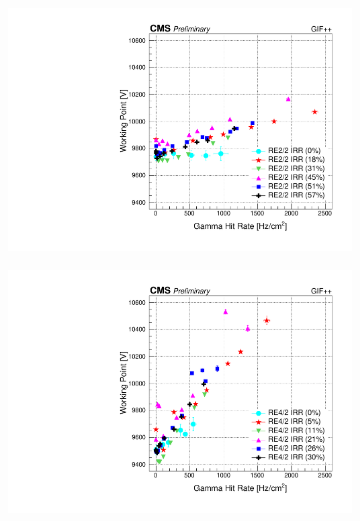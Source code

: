 	\begin{figure}[H]
    	\begin{subfigure}{0.5\linewidth}
			\centering
    		\includegraphics[width = \linewidth]{fig/chapt5/RE2-2_IRR_WorkingPoint_vs_Rate.pdf}
        	\caption{\label{fig:GIFpp_wp_vs_rate:A}}
    	\end{subfigure}
    	\begin{subfigure}{0.5\linewidth}
			\centering
    		\includegraphics[width = \linewidth]{fig/chapt5/RE4-2_IRR_WorkingPoint_vs_Rate.pdf}
        	\caption{\label{fig:GIFpp_wp_vs_rate:B}}
    	\end{subfigure}
    	\begin{subfigure}{0.5\linewidth}
			\centering

\end{subfigure}
\end{figure}
